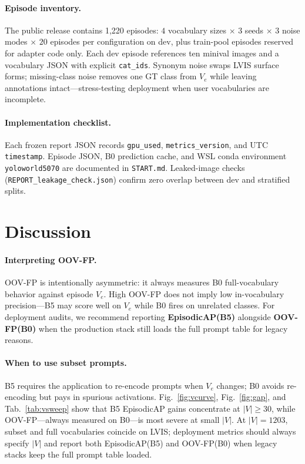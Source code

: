 \documentclass[10pt,twocolumn,letterpaper]{article}
\begin{document}
\paragraph{Episode inventory.}
The public release contains 1,220 episodes: $4$ vocabulary sizes $\times$ $3$ seeds $\times$ $3$ noise modes $\times$ $20$ episodes per configuration on dev, plus train-pool episodes reserved for adapter code only.
Each dev episode references ten minival images and a vocabulary JSON with explicit \texttt{cat\_ids}.
Synonym noise swaps LVIS surface forms; missing-class noise removes one GT class from $V_e$ while leaving annotations intact---stress-testing deployment when user vocabularies are incomplete.

\paragraph{Implementation checklist.}
Each frozen report JSON records \texttt{gpu\_used}, \texttt{metrics\_version}, and UTC \texttt{timestamp}.
Episode JSON, B0 prediction cache, and WSL conda environment \texttt{yoloworld5070} are documented in \texttt{START.md}.
Leaked-image checks (\texttt{REPORT\_leakage\_check.json}) confirm zero overlap between dev and stratified splits.

\section{Discussion}
\label{sec:disc}

\paragraph{Interpreting OOV-FP.}
OOV-FP is intentionally asymmetric: it always measures B0 full-vocabulary behavior against episode $V_e$.
High OOV-FP does not imply low in-vocabulary precision---B5 may score well on $V_e$ while B0 fires on unrelated classes.
For deployment audits, we recommend reporting \textbf{EpisodicAP(B5)} alongside \textbf{OOV-FP(B0)} when the production stack still loads the full prompt table for legacy reasons.

\paragraph{When to use subset prompts.}
B5 requires the application to re-encode prompts when $V_e$ changes; B0 avoids re-encoding but pays in spurious activations.
Fig.~\ref{fig:vcurve}, Fig.~\ref{fig:gap}, and Tab.~\ref{tab:vsweep} show that B5 EpisodicAP gains concentrate at $|V|{\ge}30$, while OOV-FP---always measured on B0---is most severe at small $|V|$.
At $|V|{=}1203$, subset and full vocabularies coincide on LVIS; deployment metrics should always specify $|V|$ and report both EpisodicAP(B5) and OOV-FP(B0) when legacy stacks keep the full prompt table loaded.
\end{document}
